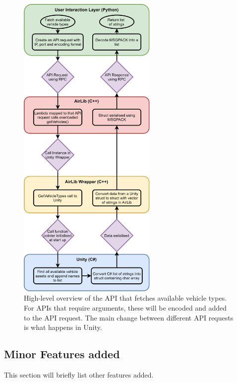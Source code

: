 \begin{figure}[h]
    \centering
    \includegraphics[width=0.6\textwidth]{06_Implementation/00_AirSim/Diagrams/stringArray.png}
    \caption{High-level overview of the API that fetches available vehicle types. For APIs that require arguments, these will be encoded and added to the API request. The main change between different API requests is what happens in Unity.} \label{06:stringList}
\end{figure}

\subsection{Minor Features added}
This section will briefly list other features added. 






